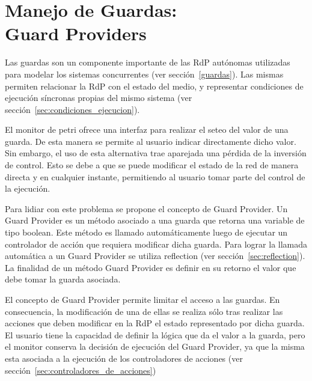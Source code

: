 \section{Manejo de Guardas: \\ Guard Providers}
\label{sec:guard_providers}
Las guardas son un componente importante de las RdP autónomas utilizadas para
modelar los sistemas concurrentes (ver
sección~\ref{guardas}). Las mismas
permiten relacionar la RdP con el estado del medio, y representar condiciones de
ejecución síncronas propias del mismo sistema (ver
sección~\ref{sec:condiciones_ejecucion}).

El monitor de petri ofrece una interfaz para realizar el seteo del valor
de una guarda. De esta manera se permite al usuario indicar directamente
dicho valor. Sin embargo, el uso de esta alternativa trae aparejada una pérdida
de la inversión de control. Esto se debe a que se puede modificar el estado
de la red de manera directa y en cualquier instante, permitiendo al usuario tomar
parte del control de la ejecución.

Para lidiar con este problema se propone el concepto de Guard Provider. Un Guard
Provider es un método asociado a una guarda que retorna una variable de tipo
boolean. Este método es llamado automáticamente luego de ejecutar un controlador
de acción que requiera modificar dicha guarda. Para lograr la llamada automática
a un Guard Provider se utiliza reflection (ver sección~\ref{sec:reflection}). La
finalidad de un método Guard Provider es definir en su retorno el valor que debe
tomar la guarda asociada. 

El concepto de Guard Provider permite limitar el acceso a las
guardas. En consecuencia, la modificación de una de ellas se realiza sólo tras
realizar las acciones que deben modificar en la RdP el estado representado por
dicha guarda. El usuario tiene la capacidad de definir la lógica que da el
valor a la guarda, pero el monitor conserva la decisión de ejecución del Guard
Provider, ya que la misma esta asociada a la ejecución de los controladores de acciones (ver
sección~\ref{sec:controladores_de_acciones})
